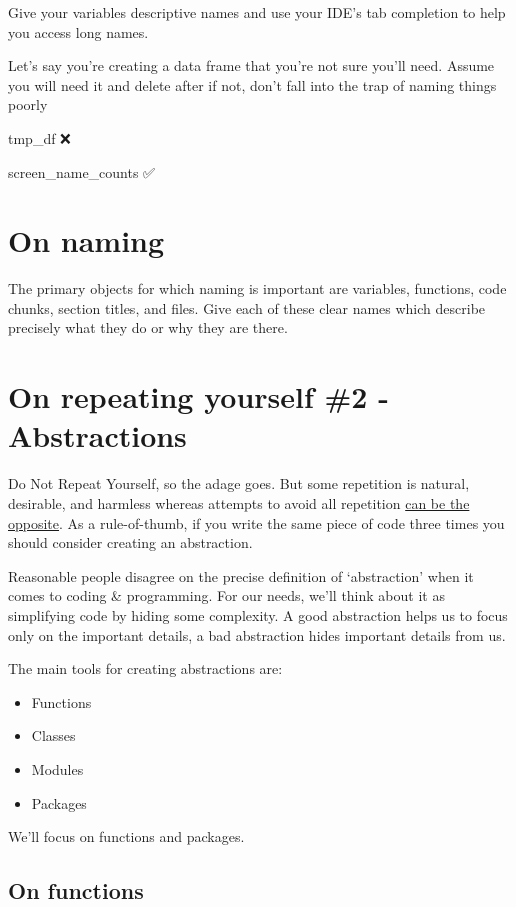 \documentclass[
  letterpaper,
  DIV=11,
  numbers=noendperiod]{scrreprt}
\providecommand{\tightlist}{%
  \setlength{\itemsep}{0pt}\setlength{\parskip}{0pt}}\usepackage{longtable,booktabs,array}
\begin{document}
Give your variables descriptive names and use your IDE's tab completion
to help you access long names.

Let's say you're creating a data frame that you're not sure you'll need.
Assume you will need it and delete after if not, don't fall into the
trap of naming things poorly

tmp\_df ❌

screen\_name\_counts ✅

\section{On naming}\label{on-naming}

The primary objects for which naming is important are variables,
functions, code chunks, section titles, and files. Give each of these
clear names which describe precisely what they do or why they are there.

\section{On repeating yourself \#2 -
Abstractions}\label{on-repeating-yourself-2---abstractions}

Do Not Repeat Yourself, so the adage goes. But some repetition is
natural, desirable, and harmless whereas attempts to avoid all
repetition
\href{https://testing.googleblog.com/2024/05/dont-dry-your-code-prematurely.html}{can
be the opposite}. As a rule-of-thumb, if you write the same piece of
code three times you should consider creating an abstraction.

Reasonable people disagree on the precise definition of `abstraction'
when it comes to coding \& programming. For our needs, we'll think about
it as simplifying code by hiding some complexity. A good abstraction
helps us to focus only on the important details, a bad abstraction hides
important details from us.

The main tools for creating abstractions are:

\begin{itemize}
\tightlist
\item
  Functions
\item
  Classes
\item
  Modules
\item
  Packages
\end{itemize}

We'll focus on functions and packages.

\subsection{On functions}\label{on-functions}
\end{document}
